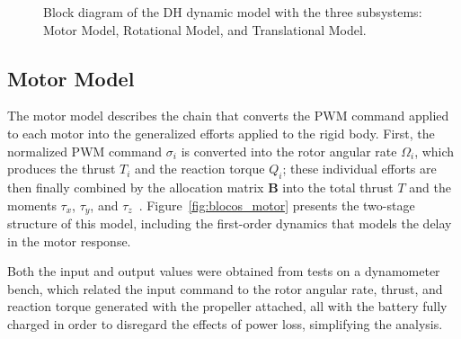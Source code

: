 \documentclass{ieeeaccess}
\begin{document}
\begin{figure}[!t]
{%
}
\caption{Block diagram of the DH dynamic model with the three subsystems: Motor Model, Rotational Model, and Translational Model.}
\label{fig:model_diagram}
\end{figure}

\subsection{Motor Model}

The motor model describes the chain that converts the PWM command applied to each motor into the generalized efforts applied to the rigid body. First, the normalized PWM command $\sigma_i$ is converted into the rotor angular rate $\Omega_i$, which produces the thrust $T_i$ and the reaction torque $Q_i$; these individual efforts are then finally combined by the allocation matrix $\mathbf{B}$ into the total thrust $T$ and the moments $\tau_x$, $\tau_y$, and $\tau_z$~\cite{c13}. Figure~\ref{fig:blocos_motor} presents the two-stage structure of this model, including the first-order dynamics that models the delay in the motor response.

Both the input and output values were obtained from tests on a dynamometer bench, which related the input command to the rotor angular rate, thrust, and reaction torque generated with the propeller attached, all with the battery fully charged in order to disregard the effects of power loss, simplifying the analysis.
\end{document}
